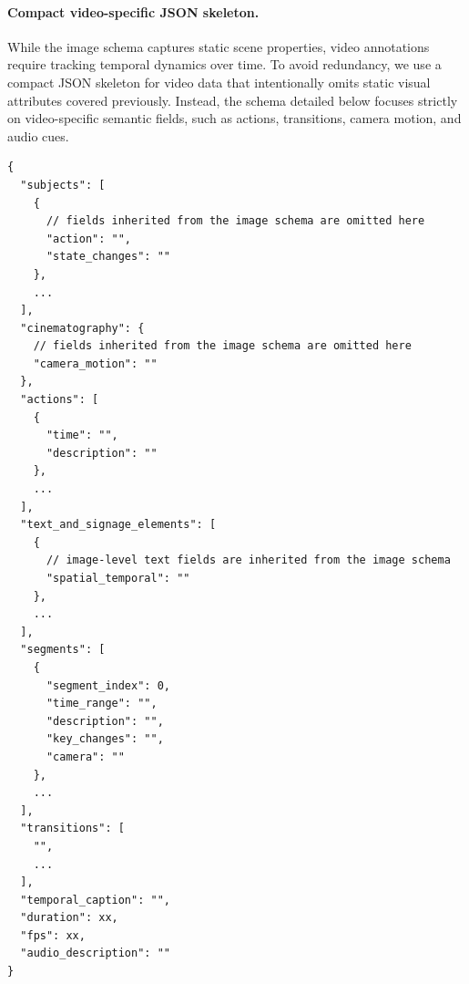 \paragraph{Compact video-specific JSON skeleton.}
While the image schema captures static scene properties, video annotations require tracking temporal dynamics over time. To avoid redundancy, we use a compact JSON skeleton for video data that intentionally omits static visual attributes covered previously. Instead, the schema detailed below focuses strictly on video-specific semantic fields, such as actions, transitions, camera motion, and audio cues.
\begin{tcolorbox}[
    breakable,
    colback=black!2,
    colframe=nvidiagreen!75!white,
    boxrule=0.4pt,
    arc=1pt,
    left=4pt,
    right=4pt,
    top=4pt,
    bottom=4pt,
    title=Compact Video-specific JSON Skeleton
]
\begin{Verbatim}[breaklines=true,breakanywhere=true,fontsize=\scriptsize]
{
  "subjects": [
    {
      // fields inherited from the image schema are omitted here
      "action": "",
      "state_changes": ""
    },
    ...
  ],
  "cinematography": {
    // fields inherited from the image schema are omitted here
    "camera_motion": ""
  },
  "actions": [
    {
      "time": "",
      "description": ""
    },
    ...
  ],
  "text_and_signage_elements": [
    {
      // image-level text fields are inherited from the image schema
      "spatial_temporal": ""
    },
    ...
  ],
  "segments": [
    {
      "segment_index": 0,
      "time_range": "",
      "description": "",
      "key_changes": "",
      "camera": ""
    },
    ...
  ],
  "transitions": [
    "",
    ...
  ],
  "temporal_caption": "",
  "duration": xx,
  "fps": xx,
  "audio_description": ""
}
\end{Verbatim}
\end{tcolorbox}